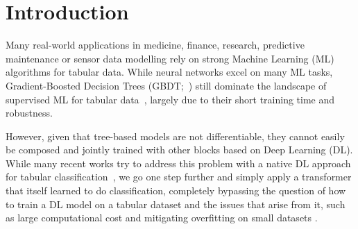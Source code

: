 \documentclass{article}
\begin{document}
\section{Introduction}
\label{sec:introduction}









%


Many real-world applications in medicine, finance, research, predictive maintenance or sensor data modelling rely on strong Machine Learning (ML) algorithms for tabular data. 
%
While neural networks excel on many ML tasks, Gradient-Boosted Decision Trees (GBDT;~\citealp{friedman-as01a}) still dominate the landscape of supervised ML for tabular data~\citep{nnsfortabular2}, largely due to their short training time and robustness.

However, given that tree-based models are not differentiable, they cannot easily be composed and jointly trained with other blocks based on Deep Learning (DL). %
While many recent works try to address this problem with a native DL approach for tabular classification~\citep{arik2021tabnet, somepalli2021saint,regcocktail,kossen2021self}, we go one step further and simply apply a transformer \citep{vaswani-neurips17a} that itself learned to do classification, completely bypassing the question of how to train a DL model on a tabular dataset and the issues that arise from it, such as large computational cost and mitigating overfitting on small datasets \citep{regcocktail}.
\end{document}
